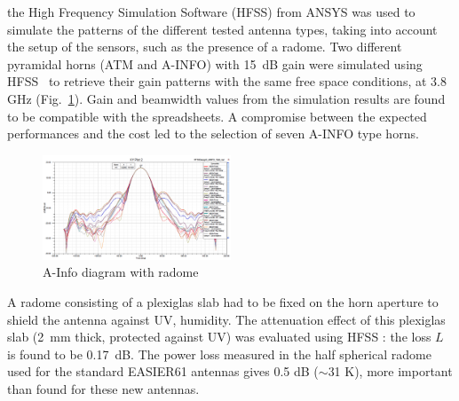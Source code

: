 the High Frequency Simulation Software (HFSS) from ANSYS was used to simulate the
patterns of the different tested antenna types, taking into account the setup of the sensors, such as the presence of a radome.
Two different pyramidal horns (ATM and A-INFO) with 15~dB gain were simulated using HFSS~\cite{HFSS} to retrieve their gain patterns with the same free space conditions, at 3.8 GHz (Fig.~\ref{fig:A-INFO_radome}). Gain and beamwidth values from the simulation results are found to be compatible with the spreadsheets.
A compromise between the expected performances and the cost led to the selection of seven A-INFO type horns.

\begin{figure}[ht]
\centering
\includegraphics[width=0.5\textwidth]{../plots/AINFO_15dB_radome_pattern_HFSS.jpg}
\caption{\small{A-Info diagram with radome}}
\label{fig:A-INFO_radome}
\end{figure}  
A radome consisting of a plexiglas slab had to be fixed on the horn aperture to shield the antenna against UV, humidity. The attenuation effect of this plexiglas slab (2~mm thick, protected against UV) was evaluated using HFSS : the loss $L$ is found to be 0.17~dB. The power loss measured in the half spherical radome used for the standard EASIER61 antennas gives 0.5 dB ($\sim$31 K), more important than found for these new antennas.


